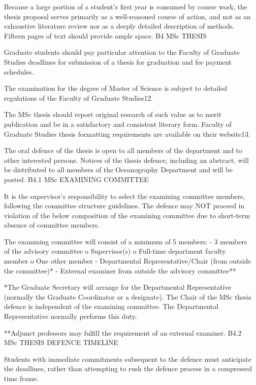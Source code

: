Because a large portion of a student’s first year is consumed by course work, the thesis proposal serves primarily as a well-reasoned course of action, and not as an exhaustive literature review nor as a deeply detailed description of methods. Fifteen pages of text should provide ample space.
B4	MSc THESIS

Graduate students should pay particular attention to the Faculty of Graduate Studies deadlines for submission of a thesis for graduation and fee payment schedules.
 

The examination for the degree of Master of Science is subject to detailed regulations of the Faculty of Graduate Studies12.

The MSc thesis should report original research of such value as to merit publication and be in a satisfactory and consistent literary form. Faculty of Graduate Studies thesis formatting requirements are available on their website13.

The oral defence of the thesis is open to all members of the department and to other interested persons. Notices of the thesis defence, including an abstract, will be distributed to all members of the Oceanography Department and will be posted.
B4.1	MSc EXAMINING COMMITTEE

It is the supervisor’s responsibility to select the examining committee members, following the committee structure guidelines. The defence may NOT proceed in violation of the below composition of the examining committee due to short-term absence of committee members.

The examining committee will consist of a minimum of 5 members:
-	3 members of the advisory committee
o	Supervisor(s)
o	Full-time department faculty member
o	One other member
-	Departmental Representative/Chair (from outside the committee)*
-	External examiner from outside the advisory committee**

*The Graduate Secretary will arrange for the Departmental Representative (normally the Graduate Coordinator or a designate). The Chair of the MSc thesis defence is independent of the examining committee. The Departmental Representative normally performs this duty.

**Adjunct professors may fulfill the requirement of an external examiner.
B4.2	MSc THESIS DEFENCE TIMELINE

Students with immediate commitments subsequent to the defence must anticipate the deadlines, rather than attempting to rush the defence process in a compressed time frame.

